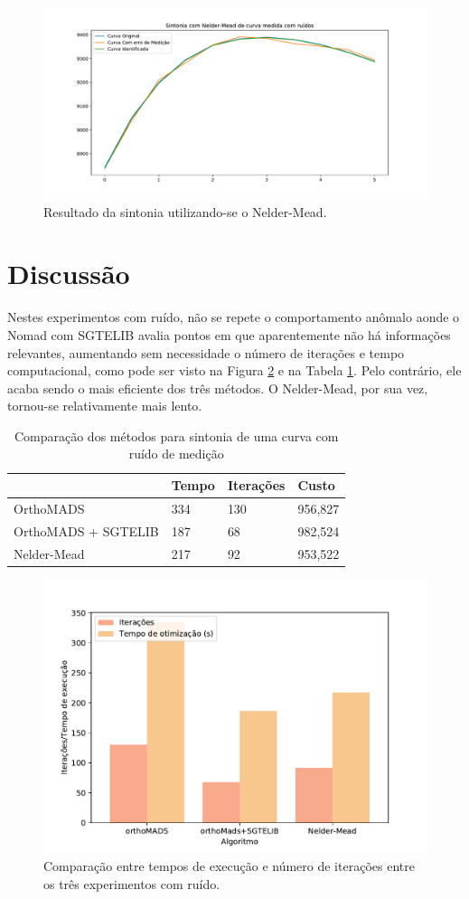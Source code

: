 \begin{figure}[H]
\centering
  \includegraphics[width=1\linewidth]{figs/curva_nm.pdf}
  \caption{Resultado da sintonia utilizando-se o Nelder-Mead.}
  \label{fig:exp2_nm_curve}
\end{figure}

\section{Discussão}
Nestes experimentos com ruído, não se repete o comportamento anômalo aonde o Nomad com SGTELIB avalia pontos em que aparentemente não há informações relevantes, aumentando sem necessidade o número de iterações e tempo computacional, como pode ser visto na Figura \ref{fig:comp2} e na Tabela \ref{tab:res2}.
%
Pelo contrário, ele acaba sendo o mais eficiente dos três métodos. O Nelder-Mead, por sua vez, tornou-se relativamente mais lento.

%

%

\begin{table}[H]
\centering
\caption{Comparação dos métodos para sintonia de uma curva com ruído de medição}
\label{tab:res2}
\begin{tabular}{|l|l|l|l|}
\hline
                    & Tempo & Iterações & Custo   \\ \hline
OrthoMADS           & 334   & 130       & 956,827 \\ \hline
OrthoMADS + SGTELIB & 187   & 68        & 982,524 \\ \hline
Nelder-Mead         & 217   & 92        & 953,522 \\ \hline
\end{tabular}
\end{table}




\begin{figure}[H]
\centering
  \includegraphics[width=0.7\linewidth]{figs/comp_time_iter_2.pdf}
  \caption{Comparação entre tempos de execução e número de iterações entre os três experimentos com ruído.}
  \label{fig:comp2}
\end{figure}






